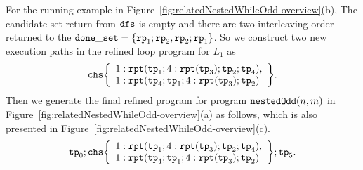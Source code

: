 For the running example in Figure~\ref{fig:relatedNestedWhileOdd-overview}(b),
The candidate set return from $\mathtt{dfs}$ is empty and there are two interleaving order returned to the 
$\kw{done\_set} = \left\{ \rprog_1;\rprog_2, \rprog_2;\rprog_1 \right\}$.
So we construct two new execution paths in the refined loop program for $L_1$ as 
\[
\rpchoose{ 
 \begin{array}{l}
 1: \rprepeat(\tpath_1; 4:\rprepeat(\tpath_3); \tpath_2; \tpath_4), \\
 1: \rprepeat(\tpath_4; \tpath_1; 4:\rprepeat(\tpath_3); \tpath_2) 
 \end{array}
 }.
\]
Then we generate the final refined program for program $\mathtt{nestedOdd}(n, m)$ in Figure~\ref{fig:relatedNestedWhileOdd-overview}(a) as follows, which is also presented in Figure~\ref{fig:relatedNestedWhileOdd-overview}(c).
\[
 \tpath_0 ; \rpchoose{ 
 \begin{array}{l}
    1: \rprepeat(\tpath_1; 4:\rprepeat(\tpath_3); \tpath_2; \tpath_4), \\
    1: \rprepeat(\tpath_4; \tpath_1; 4:\rprepeat(\tpath_3); \tpath_2) 
 \end{array}
 }; \tpath_5.
\]

